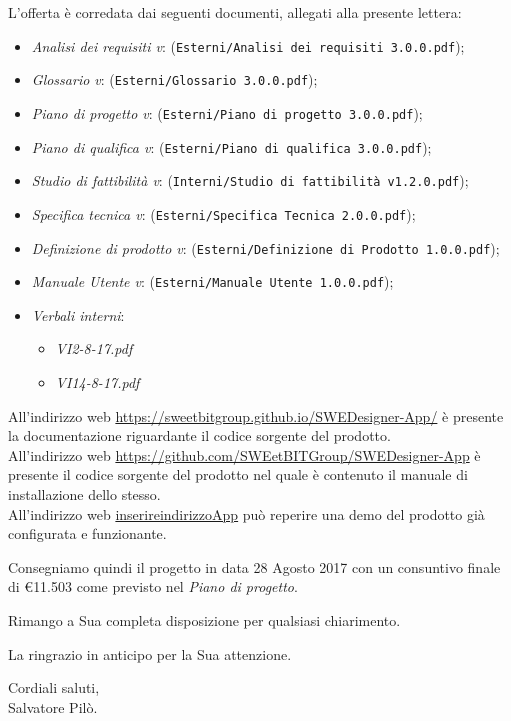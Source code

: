 	L'offerta è corredata dai seguenti documenti, allegati alla presente lettera:
	\begin{itemize}
		\item \emph{Analisi dei requisiti v\VersioneAR{}}: (\verb|Esterni/Analisi dei requisiti 3.0.0.pdf|);
		\item \emph{Glossario v\VersioneG{}}: (\verb|Esterni/Glossario 3.0.0.pdf|);
		\item \emph{Piano di progetto v\VersionePP{}}: (\verb|Esterni/Piano di progetto 3.0.0.pdf|);
		\item \emph{Piano di qualifica v\VersionePQ{}}: (\verb|Esterni/Piano di qualifica 3.0.0.pdf|);
		\item \emph{Studio di fattibilità v\VersioneSF{}}: (\verb|Interni/Studio di fattibilità v1.2.0.pdf|);
		\item \emph{Specifica tecnica v\VersioneST{}}: (\verb|Esterni/Specifica Tecnica 2.0.0.pdf|);
		\item \emph{Definizione di prodotto v\VersioneDP{}}: (\verb|Esterni/Definizione di Prodotto 1.0.0.pdf|);
		\item \emph{Manuale Utente v\VersioneMU{}}: (\verb|Esterni/Manuale Utente 1.0.0.pdf|);
		\item \emph{Verbali interni}:
		\begin{itemize}
			\item \emph{VI2-8-17.pdf}
			\item \emph{VI14-8-17.pdf}
		\end{itemize}
	\end{itemize}
	All'indirizzo web \url{https://sweetbitgroup.github.io/SWEDesigner-App/} è presente la documentazione riguardante il codice sorgente del prodotto.\\
	All'indirizzo web \url{https://github.com/SWEetBITGroup/SWEDesigner-App} è presente il codice sorgente del prodotto nel quale è contenuto il manuale
	di installazione dello stesso.\\
	All'indirizzo web \url{inserireindirizzoApp} può reperire una demo del prodotto già configurata e funzionante.

	Consegniamo quindi il progetto in data 28 Agosto 2017 con un consuntivo finale di \euro{11.503} come previsto nel \emph{Piano di progetto}.
	\begin{flushleft}
	\vspace{2cm}
		Rimango a Sua completa disposizione per qualsiasi chiarimento.
	\end{flushleft}
	\begin{flushleft}
		La ringrazio in anticipo per la Sua attenzione.
	\end{flushleft}
	\vspace{5mm}
	\begin{center}
		Cordiali saluti,\\
		\vspace{1cm}Salvatore Pilò.
	\end{center}
